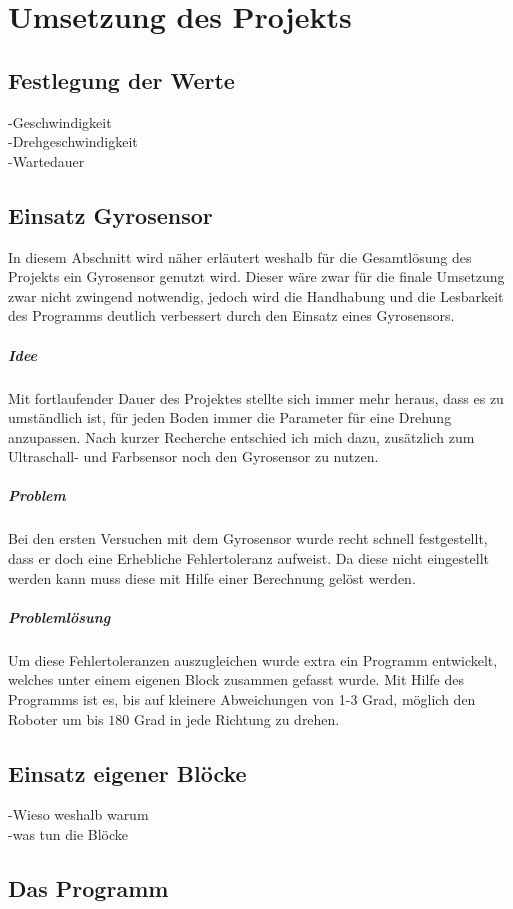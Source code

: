 \chapter{Umsetzung des Projekts}
\section{Festlegung der Werte}
-Geschwindigkeit\\
-Drehgeschwindigkeit\\
-Wartedauer\\

\section{Einsatz Gyrosensor}
In diesem Abschnitt wird näher erläutert weshalb für die Gesamtlösung des Projekts ein Gyrosensor genutzt wird. Dieser wäre zwar für die finale Umsetzung zwar nicht zwingend notwendig, jedoch wird die Handhabung und die Lesbarkeit des Programms deutlich verbessert durch den Einsatz eines Gyrosensors.

\paragraph{Idee}Mit fortlaufender Dauer des Projektes stellte sich immer mehr heraus, dass es zu umständlich ist, für jeden Boden immer die Parameter für eine Drehung anzupassen.  Nach kurzer Recherche entschied ich mich dazu, zusätzlich zum Ultraschall- und Farbsensor noch den Gyrosensor zu nutzen.
\paragraph{Problem} Bei den ersten Versuchen mit dem Gyrosensor wurde recht schnell festgestellt, dass er doch eine Erhebliche Fehlertoleranz aufweist. Da diese nicht eingestellt werden kann muss diese mit Hilfe einer Berechnung gelöst werden. 

\paragraph{Problemlösung} 
Um diese Fehlertoleranzen auszugleichen wurde extra ein Programm entwickelt, welches unter einem eigenen Block zusammen gefasst wurde. Mit Hilfe des Programms ist es, bis auf kleinere Abweichungen von 1-3 Grad, möglich den Roboter um bis $180$ Grad in jede Richtung zu drehen.  

\section{Einsatz eigener Blöcke}
-Wieso weshalb warum\\
-was tun die Blöcke\\
\section{Das Programm}

